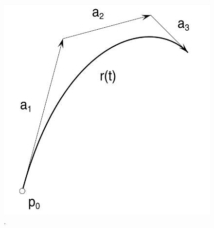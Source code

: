 \begin{figure}[!t]
    \centering
    \includegraphics[scale=0.4]{resources/bezier-curves-example.png}
    .
    \label{fig:bezier-example}
\end{figure}